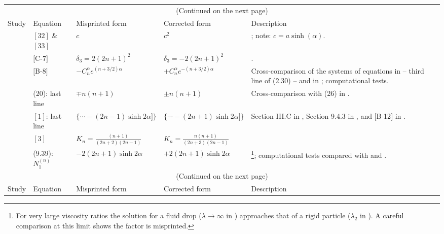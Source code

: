 \documentclass[../thesis.tex]{subfiles}
\begin{document}
\begin{landscape}
\begin{longtable}{p{3cm}p{3cm}p{5.0cm}p{5.25cm}p{5.5cm}}
 \multicolumn{5}{c}{(Continued on the next page)}%
 \\ \newpage \hline								 %
 Study & Equation & Misprinted form & Corrected  %
 form & Description \\ \hline					 %
 
 \multirow[t]{3}{3cm}{\citet{HHS73}} & $[32]$ \& $[33]$ & $c$ & $c^2$ & \citet{Z82}; note: \mbox{$c=a\sinh(\alpha)$}.
 \\ \cline{2-5}
 & $[$C-7$]$ & $\delta_3=2(2n+1)^2$ & $\delta_3=-2(2n+1)^2$ & \citet{Z82}.
 \\ \cline{2-5}
 & $[$B-8$]$ & $-C_n^\alpha e^{(n+3/2)\alpha}$ & $+C_n^\alpha e^{-(n+3/2)\alpha}$ & Cross-comparison of the systems of equations in \cite{WW72} -- third line of (2.30) -- and in \cite{HHS73}; computational tests.
 \\ \hline
 
 \citet{RM74} & (20): last line & $\mp n(n+1)$ & $\pm n(n+1)$ & Cross-comparison with (26) in \citet{SJ26}.
 \\ \hline
 
 \citet{BRI78} & $[1]$: last line & $\Big\{\cdots-(2n-1)\sinh2\alpha]\Big\}$ & $\Big\{\cdots-(2n+1)\sinh2\alpha]\Big\}$ & Section III.C in \cite{DSR89}, Section 9.4.3 in \cite{KK13}, and $[$B-12$]$ in \cite{HHS73}.
 \\ \cline{2-4}
 & $[3]$ & $K_n=\frac{(n+1)}{(2n+2)(2n-1)}$ & $K_n=\frac{n(n+1)}{(2n+3)(2n-1)}$ &
 \\ \hline
 
 \citet{KK13} & (9.39): $N_1^{(n)}$ & $-2(2n+1)\sinh2\alpha$ & $+2(2n+1)\sinh2\alpha$ & \footnote{For very large viscosity ratios the solution for a fluid drop ($\lambda\to\infty$ in \cite{KK13}) approaches that of a rigid particle ($\lambda_2$ in \cite{M61}). A careful comparison at this limit shows the factor is misprinted.}\cite{M61}; computational tests compared with \cite{HHS73} and \cite{BRI78}.
 \\ \hline
 
 \multicolumn{5}{c}{(Continued on the next page)}%
 \\ \newpage \hline								 %
 Study & Equation & Misprinted form & Corrected  %
 form & Description \\ \hline					 %


\end{longtable}
\end{landscape}
\end{document}
